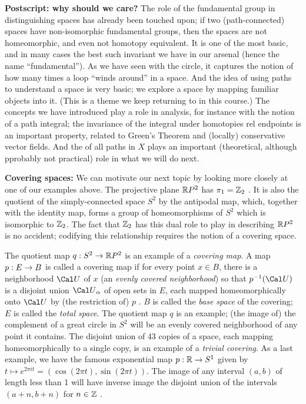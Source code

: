 {\bf Postscript:  why should we care?} The role of the fundamental group
in distinguishing spaces has already been touched upon; if two 
(path-connected) spaces have non-isomorphic fundamental groups, then
the spaces are not homeomorphic, and even not homotopy equivalent.
It is one of the most basic, and in many cases the best such invariant
we have in our arsenal
(hence the name ``fundamental''). As we have seen with the circle, it
captures the notion of how many times a loop ``winds around'' in a space.
And the idea of using paths to understand a space is very basic; we 
explore a space by mapping familiar objects into it. (This is 
a theme we keep returning to in this course.) The concepts we 
have introduced play a role in analysis, for instance with the notion
of a path integral; the invariance of the integral under homotopies
rel endpoints is an important property, related to Green's Theorem
and (locally) conservative vector fields. And the 
of all paths in $X$ plays an important (theoretical, although
pprobably not practical) role in what we will do next.

\bsk

{\bf Covering spaces:} We can motivate our next topic by looking more
closely at one of our examples above. The projective plane ${\Bbb R}P^2$
has $\pi_1 = {\Bbb Z}_2$ . It is also the quotient of the simply-connected
space $S^2$ by the antipodal map, which, together with the identity map,
forms a group of homeomorphisms of $S^2$ which is isomorphic to ${\Bbb Z}_2$.
The fact that ${\Bbb Z}_2$ has this dual role to play in describing 
${\Bbb R}P^2$ is no accident; codifying this relationship requires the 
notion of a covering space.

\msk

The quotient map $q:S^2\rightarrow {\Bbb R}P^2$ is an example of a {\it covering map}.
A map $p:E\rightarrow B$ is called a covering map if for every point $x\in B$, there
is a neighborhood ${\Cal U}$ of $x$ (an
{\it evenly covered neighborhood}) so that $p^{-1}({\Cal U})$ 
is a disjoint union ${\Cal U}_\alpha$ of open sets in $E$, each mapped
homeomorphically onto ${\Cal U}$ by (the restriction of) $p$ . $B$ is
called the {\it base space} of the covering; $E$ is called the {\it total
space}. The quotient map $q$ is an example; (the image of) the complement
of a great circle in $S^2$ will be an evenly covered neighborhood
of any point it contains. The disjoint union of 43 copies of a space,
each mapping homeomorphically to a single copy, is an example of a 
{\it trivial covering}. As a last example, we have the famous 
exponential map $p:{\Bbb R}\rightarrow S^1$ given by $t\mapsto e^{2\pi it} = 
(\cos (2\pi t),\sin (2\pi t))$. The image of any interval $(a,b)$ of length
less than 1 will have inverse image the disjoint union of the
intervals $(a+n,b+n)$ for $n\in{\Bbb Z}$ .

